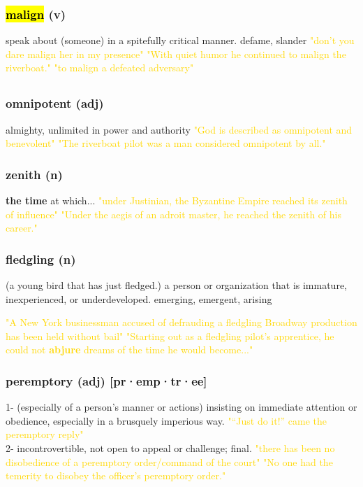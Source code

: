 \documentclass{proc}
\begin{document}
		\subsubsection{\textcolor{brickred}{\hl{malign}} (v)}
		speak about (someone) in a spitefully critical manner.
		defame,
		slander
		\textcolor{gold}{"don't you dare malign her in my presence"
		"With quiet humor he continued to malign the riverboat."
		"to malign a defeated adversary"}
		
		\newpage
		\subsection{}
		\subsubsection{\textcolor{brickred}{omnipotent} (adj)}
		almighty, unlimited in power and authority
		\textcolor{gold}{"God is described as omnipotent and benevolent"
		"The riverboat pilot was a man considered omnipotent by all."}
		
		\subsubsection{\textcolor{brickred}{zenith} (n)}
		\textbf{the time} at which...
		\textcolor{gold}{"under Justinian, the Byzantine Empire reached its zenith of influence"
		"Under the aegis of an adroit master, he reached the zenith of his career."}
		
		\subsubsection{\textcolor{brickred}{fledgling} (n)}
		(a young bird that has just fledged.) a person or organization that is immature, inexperienced, or underdeveloped.
		emerging,
		emergent,
		arising
		
		\textcolor{gold}{"A New York businessman accused of defrauding a fledgling Broadway production has been held without bail"
		"Starting out as a 
		fledgling pilot's apprentice, he could not \textbf{abjure} dreams of the 
		time he would become..."}
		
		\subsubsection{\textcolor{brickred}{peremptory} (adj) [pr·emp·tr·ee]}
		1- (especially of a person's manner or actions) insisting on immediate attention or obedience, especially in a brusquely imperious way.
		\textcolor{gold}{"“Just do it!” came the peremptory reply"}\\
		2- incontrovertible, not open to appeal or challenge; final.
		\textcolor{gold}{"there has been no disobedience of a peremptory order/command of the court"
		"No one had the temerity to disobey the officer's peremptory order."}
		
\end{document}
